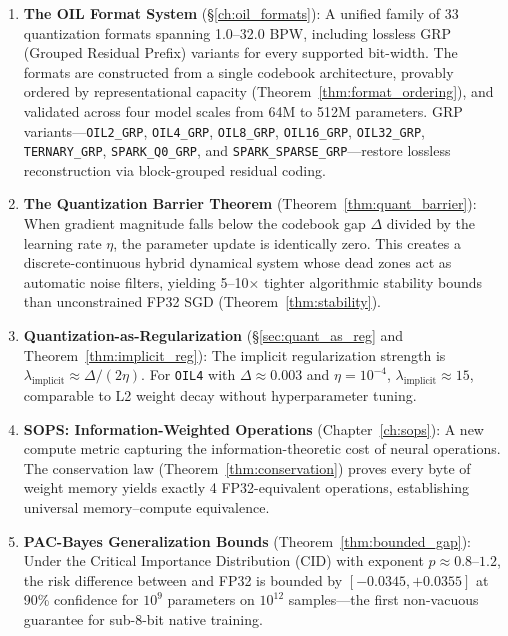 \begin{enumerate}

    \item \textbf{The OIL Format System} (\S\ref{ch:oil_formats}): A unified family of 33 quantization formats spanning 1.0--32.0 BPW, including lossless GRP (Grouped Residual Prefix) variants for every supported bit-width. The formats are constructed from a single codebook architecture, provably ordered by representational capacity (Theorem~\ref{thm:format_ordering}), and validated across four model scales from 64M to 512M parameters. GRP variants---\texttt{OIL2\_GRP}, \texttt{OIL4\_GRP}, \texttt{OIL8\_GRP}, \texttt{OIL16\_GRP}, \texttt{OIL32\_GRP}, \texttt{TERNARY\_GRP}, \texttt{SPARK\_Q0\_GRP}, and \texttt{SPARK\_SPARSE\_GRP}---restore lossless reconstruction via block-grouped residual coding.

    \item \textbf{The Quantization Barrier Theorem} (Theorem~\ref{thm:quant_barrier}): When gradient magnitude falls below the codebook gap $\Delta$ divided by the learning rate $\eta$, the parameter update is identically zero. This creates a discrete-continuous hybrid dynamical system whose dead zones act as automatic noise filters, yielding 5--10$\times$ tighter algorithmic stability bounds than unconstrained FP32 SGD (Theorem~\ref{thm:stability}).

    \item \textbf{Quantization-as-Regularization} (\S\ref{sec:quant_as_reg} and Theorem~\ref{thm:implicit_reg}): The implicit regularization strength is $\lambda_{\text{implicit}} \approx \Delta / (2\eta)$. For \texttt{OIL4} with $\Delta \approx 0.003$ and $\eta = 10^{-4}$, $\lambda_{\text{implicit}} \approx 15$, comparable to L2 weight decay without hyperparameter tuning.

    \item \textbf{SOPS: Information-Weighted Operations} (Chapter~\ref{ch:sops}): A new compute metric capturing the information-theoretic cost of neural operations. The conservation law (Theorem~\ref{thm:conservation}) proves every byte of weight memory yields exactly 4 FP32-equivalent operations, establishing universal memory--compute equivalence.

    \item \textbf{PAC-Bayes Generalization Bounds} (Theorem~\ref{thm:bounded_gap}): Under the Critical Importance Distribution (CID) with exponent $p \approx 0.8$--$1.2$, the risk difference between \OIL{} and FP32 is bounded by $[-0.0345, +0.0355]$ at 90\% confidence for $10^9$ parameters on $10^{12}$ samples---the first non-vacuous guarantee for sub-8-bit native training.


\end{enumerate}
